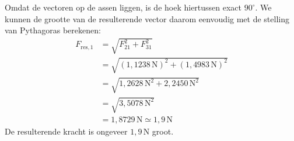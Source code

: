 \documentclass{ximera}
\begin{document}
\begin{exercise}
\begin{solution}
        Omdat de vectoren op de assen liggen, is de hoek hiertussen exact $90^\circ$. We kunnen de grootte van de resulterende vector daarom eenvoudig met de stelling van Pythagoras berekenen:
        \begin{align*}
            F_{\text{res},1} &= \sqrt{F_{21}^{2} + F_{31}^{2}} \\
            &= \sqrt{(1{,}1238 \, \mathrm{N})^{2} + (1{,}4983 \, \mathrm{N})^{2}} \\
            &= \sqrt{1{,}2628\, \mathrm{N}^2 + 2{,}2450\, \mathrm{N}^2} \\
            &= \sqrt{3{,}5078\, \mathrm{N}^2} \\
            &= 1{,}8729 \, \mathrm{N} \simeq \boxed{1{,}9 \, \mathrm{N}}
        \end{align*}
        De resulterende kracht is ongeveer $1{,}9 \, \mathrm{N}$ groot.
    \end{solution}
\end{exercise}


\end{document}
